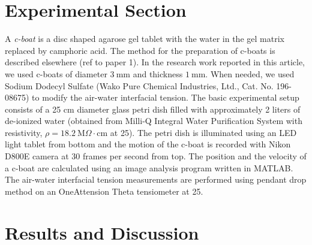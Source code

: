 \documentclass[aps, twocolumn, floatfix, superscriptaddress]{revtex4}
\begin{document}
\section{Experimental Section}
A \emph{c-boat} is a disc shaped agarose gel tablet with the water in the gel matrix replaced by camphoric acid. The method for the preparation of c-boats is described elsewhere (ref to paper 1). In the research work reported in this article, we used c-boats of diameter $3\ \mathrm{mm}$ and thickness $1\ \mathrm{mm}$. When needed, we used Sodium Dodecyl Sulfate (Wako Pure Chemical Industries, Ltd., Cat. No. 196-08675) to modify the air-water interfacial tension. The basic experimental setup consists of a 25 $\mathrm{cm}$ diameter glass petri dish filled with approximately 2 liters of de-ionized water (obtained from Milli-Q Integral Water Purification System with resistivity, $\rho=18.2\ \mathrm{M}\Omega\cdot\mathrm{cm}$ at 25\celsius). The petri dish is illuminated using an LED light tablet from bottom and the motion of the c-boat is recorded with Nikon D800E camera at 30 frames per second from top. The position and the velocity of a c-boat are calculated using an image analysis program written in MATLAB. The air-water interfacial tension measurements are performed using pendant drop method on an OneAttension Theta tensiometer at 25\celsius. 

\section{Results and Discussion}
\end{document}
